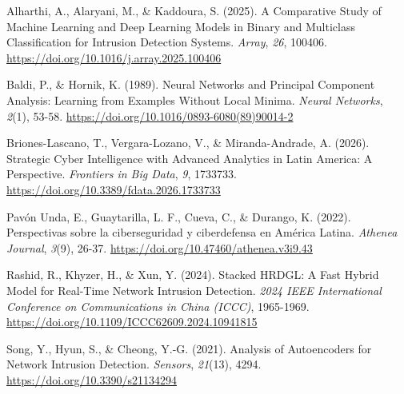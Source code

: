 \documentclass[
  spanish,
  11pt,
]{article}
\newlength{\cslhangindent}
\newenvironment{CSLReferences}[2] %
 {\begin{list}{}{%
  \setlength{\itemindent}{0pt}
  \setlength{\leftmargin}{0pt}
  \setlength{\parsep}{0pt}
  \ifodd #1
   \setlength{\leftmargin}{\cslhangindent}
   \setlength{\itemindent}{-1\cslhangindent}
  \fi
  \setlength{\itemsep}{#2\baselineskip}}}
 {\end{list}}
\begin{document}
\protect{}\label{refs}
\begin{CSLReferences}{1}{0}
Alharthi, A., Alaryani, M., \& Kaddoura, S. (2025). A Comparative Study of Machine Learning and Deep Learning Models in Binary and Multiclass Classification for Intrusion Detection Systems. \emph{Array}, \emph{26}, 100406. \url{https://doi.org/10.1016/j.array.2025.100406}

Baldi, P., \& Hornik, K. (1989). Neural Networks and Principal Component Analysis: Learning from Examples Without Local Minima. \emph{Neural Networks}, \emph{2}(1), 53-58. \url{https://doi.org/10.1016/0893-6080(89)90014-2}

Briones-Lascano, T., Vergara-Lozano, V., \& Miranda-Andrade, A. (2026). Strategic Cyber Intelligence with Advanced Analytics in Latin America: A Perspective. \emph{Frontiers in Big Data}, \emph{9}, 1733733. \url{https://doi.org/10.3389/fdata.2026.1733733}

Pavón Unda, E., Guaytarilla, L. F., Cueva, C., \& Durango, K. (2022). Perspectivas sobre la ciberseguridad y ciberdefensa en América Latina. \emph{Athenea Journal}, \emph{3}(9), 26-37. \url{https://doi.org/10.47460/athenea.v3i9.43}

Rashid, R., Khyzer, H., \& Xun, Y. (2024). Stacked HRDGL: A Fast Hybrid Model for Real-Time Network Intrusion Detection. \emph{2024 IEEE International Conference on Communications in China (ICCC)}, 1965-1969. \url{https://doi.org/10.1109/ICCC62609.2024.10941815}

Song, Y., Hyun, S., \& Cheong, Y.-G. (2021). Analysis of Autoencoders for Network Intrusion Detection. \emph{Sensors}, \emph{21}(13), 4294. \url{https://doi.org/10.3390/s21134294}

\end{CSLReferences}
\end{document}

